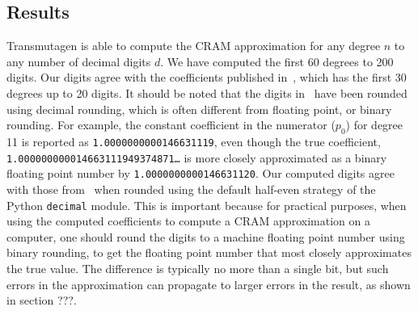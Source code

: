 
\subsection{Results}

Transmutagen is able to compute the CRAM approximation for any degree $n$ to
any number of decimal digits $d$. We have computed the first $60$ degrees to
200 digits. Our digits agree with the coefficients published
in~\cite{carpenter1984extended}, which has the first 30 degrees up to 20
digits. It should be noted that the digits in~\cite{carpenter1984extended}
have been rounded using decimal rounding, which is often different from
floating point, or binary rounding. For example, the constant coefficient in
the numerator ($p_0$) for degree 11 is reported as
\texttt{1.0000000000146631119}, even though the true coefficient,
\texttt{1.000000000014663111949374871\ldots} is more closely approximated as a
binary floating point number by \texttt{1.0000000000146631120}. Our computed
digits agree with those from~\cite{carpenter1984extended} when rounded using
the default half-even strategy of the Python \texttt{decimal} module. This is
important because for practical purposes, when using the computed coefficients
to compute a CRAM approximation on a computer, one should round the digits to
a machine floating point number using binary rounding, to get the floating
point number that most closely approximates the true value. The difference is
typically no more than a single bit, but such errors in the approximation can
propagate to larger errors in the result, as shown in section {\color{red}???}.
